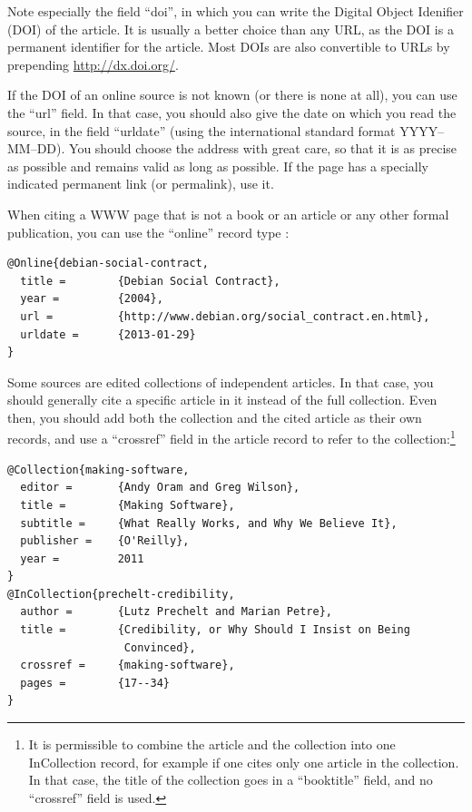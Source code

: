 \documentclass[utf8,english]{gradu3}
\begin{document}
Note especially the field ``doi'', in which you can write the Digital
Object Idenifier (DOI) of the article.  It is usually a better choice
than any URL, as the DOI is a permanent identifier for the article.
Most DOIs are also convertible to URLs by prepending
\url{http://dx.doi.org/}.

If the DOI of an online source is not known (or there is none at all),
you can use the ``url'' field.  In that case, you should also give the
date on which you read the source, in the field ``urldate'' (using the
international standard format YYYY--MM--DD).  You should choose the
address with great care, so that it is as precise as possible and
remains valid as long as possible.  If the page has a specially
indicated permanent link (or permalink), use it.

When citing a WWW page that is not a book or an article or any other
formal publication, you can use the ``online'' record
type \parencite[eg.][]{debian-social-contract}:

\begingroup\footnotesize
\begin{verbatim}
@Online{debian-social-contract,
  title =        {Debian Social Contract},
  year =         {2004},
  url =          {http://www.debian.org/social_contract.en.html},
  urldate =      {2013-01-29}
}
\end{verbatim}
\endgroup

Some sources are edited collections of independent articles.  In that
case, you should generally cite a specific article in
it \parencite[eg.][]{prechelt-credibility} instead of the full
collection.  Even then, you should add both the collection and the
cited article as their own records, and use a ``crossref'' field in
the article record to refer to the collection:\footnote{It is
  permissible to combine the article and the collection into one
  InCollection record, for example if one cites only one article in
  the collection.  In that case, the title of the collection goes in a
  ``booktitle'' field, and no ``crossref'' field is used.}

\begingroup\footnotesize
\begin{verbatim}
@Collection{making-software,
  editor =       {Andy Oram and Greg Wilson},
  title =        {Making Software},
  subtitle =     {What Really Works, and Why We Believe It},
  publisher =    {O'Reilly},
  year =         2011
}
@InCollection{prechelt-credibility,
  author =       {Lutz Prechelt and Marian Petre},
  title =        {Credibility, or Why Should I Insist on Being
                  Convinced},
  crossref =     {making-software},
  pages =        {17--34}
}
\end{verbatim}
\endgroup
\end{document}
